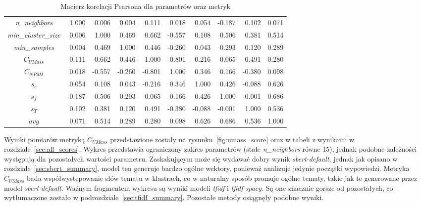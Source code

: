 	\begin{table}[htb]
		\caption{Macierz korelacji Pearsona dla parametrów oraz metryk}\label{tab:corr}
		\centering
		\small
		\begin{tabular}{c|rrrrrrrrr}	%
			\toprule
			{} &  \rotatebox[origin=c]{90}{\emph{n\_neighbors}} & \rotatebox[origin=c]{90}{\emph{min\_cluster\_size}} & \rotatebox[origin=c]{90}{\emph{min\_samples}} & \rotatebox[origin=c]{90}{\(C_{UMass}\)} & \rotatebox[origin=c]{90}{\(C_{NPMI}\)} & \rotatebox[origin=c]{90}{\(s_c\)} & \rotatebox[origin=c]{90}{\(s_f\)} & \rotatebox[origin=c]{90}{\(s_T\)} & \rotatebox[origin=c]{90}{\(avg\)} \\
			\midrule
			\emph{n\_neighbors}					&  1.000 &  0.006 &  0.004 &  0.111 &  0.018 &  0.054 & -0.187 &  0.102 &  0.071 \\
			\emph{min\_cluster\_size}		&  0.006 &  1.000 &  0.469 &  0.662 & -0.557 &  0.108 &  0.506 &  0.381 &  0.514 \\
			\emph{min\_samples}					&  0.004 &  0.469 &  1.000 &  0.446 & -0.260 &  0.043 &  0.293 &  0.120 &  0.289 \\
			\(C_{UMass}\)								&  0.111 &  0.662 &  0.446 &  1.000 & -0.801 & -0.216 &  0.065 &  0.491 &  0.280 \\
			\(C_{NPMI}\)								&  0.018 & -0.557 & -0.260 & -0.801 &  1.000 &  0.346 &  0.166 & -0.380 &  0.098 \\
			\(s_c\)											&  0.054 &  0.108 &  0.043 & -0.216 &  0.346 &  1.000 &  0.426 & -0.088 &  0.626 \\
			\(s_f\)											& -0.187 &  0.506 &  0.293 &  0.065 &  0.166 &  0.426 &  1.000 & -0.001 &  0.686 \\
			\(s_T\)											&  0.102 &  0.381 &  0.120 &  0.491 & -0.380 & -0.088 & -0.001 &  1.000 &  0.536 \\
			\(avg\)											&  0.071 &  0.514 &  0.289 &  0.280 &  0.098 &  0.626 &  0.686 &  0.536 &  1.000 \\
			\bottomrule
		\end{tabular}			
	\end{table}

	Wyniki pomiarów metryką \(C_{UMass}\) przedstawione zostały na rysunku~\ref{fig:umass_score} oraz w tabeli z wynikami w rozdziale~\ref{sec:all_scores}.
	Wykres przedstawia ograniczony zakres parametrów (stałe \emph{n\_neighbors} równe 15), jednak podobne zależności występują dla pozostałych wartości parametru.
	Zaskakującym może się wydawać dobry wynik \emph{sbert-default}, jednak jak opisano w rozdziale~\ref{sec:sbert_summary},
		model ten generuje bardzo ogólne wektory, ponieważ analizuje jedynie początki wypowiedzi.
	Metryka \(C_{UMass}\) bada współwystępowanie słów tematu w klastrach, co w naturalny sposób promuje ogólne tematy,
		takie jak te generowane przez model \emph{sbert-default}.
	Ważnym fragmentem wykresu są wyniki modeli \emph{tfidf} i \emph{tfidf-spacy}.
	Są one znacznie gorsze od pozostałych, co wytłumaczone zostało w podrozdziale~\ref{sec:tfidf_summary}.
	Pozostałe metody osiągnęły podobne wyniki.
	

